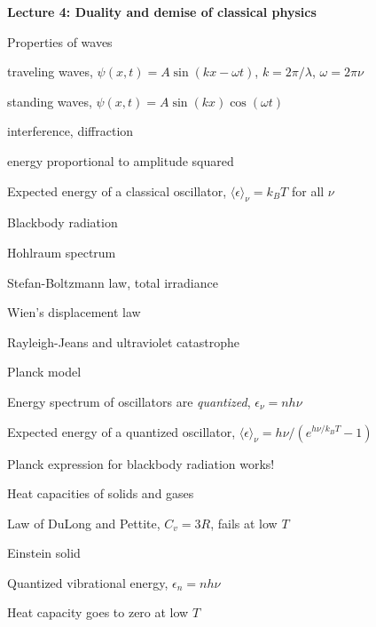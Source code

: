 \message{ !name(Outline.tex)}\documentclass[11pt]{article}
\begin{document}
\begin{outline}
\item{{\bf Lecture 4: Duality and demise of classical physics}}
  \begin{outline}
    \item{Properties of waves}
      \begin{outline}
      \item traveling waves, $\psi(x,t)=A \sin(kx-\omega t)$, $k=2\pi/\lambda$, $\omega=2\pi\nu$
      \item standing waves, $\psi(x,t) = A \sin(kx) \cos(\omega t) $
      \item interference, diffraction
      \item energy proportional to amplitude squared
      \item  Expected energy of a classical oscillator, $\langle \epsilon \rangle _\nu = k_B T$ for all $\nu$
      \end{outline}
    \item{Blackbody radiation}
      \begin{outline}
      \item Hohlraum spectrum
      \item Stefan-Boltzmann law, total irradiance 
      \item Wien's displacement law
      \item{Rayleigh-Jeans and ultraviolet catastrophe}
      \item{Planck model}
        \begin{outline}
        \item Energy spectrum of oscillators are {\em quantized}, $\epsilon_\nu=nh\nu$ 
        \item Expected energy of a quantized oscillator, $\langle \epsilon \rangle_\nu = h\nu/\left (
          e^{h\nu/k_BT}-1 \right ) $
      \item Planck expression for blackbody radiation works!
      \end{outline}

    \end{outline}
  \item{Heat capacities of solids and gases}
    \begin{outline}
    \item Law of DuLong and Pettite, $C_v = 3R$, fails at low $T$
    \item Einstein solid
      \begin{outline}
      \item Quantized vibrational energy, $\epsilon_n=nh\nu$
      \item Heat capacity goes to zero at low $T$
      \end{outline}
  \end{outline}


\end{outline}
\end{outline}
\end{document}
